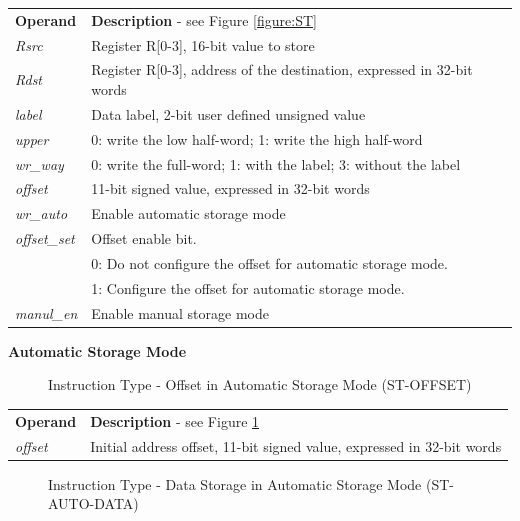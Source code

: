 \documentclass[main\_\_EN.tex]{subfiles}
\begin{document}
\begin{tabular}{ l l }
\textbf{Operand} & \textbf{Description} - see Figure \ref{figure:ST} \\
\textit{Rsrc} & Register R[0-3], 16-bit value to store\\
\textit{Rdst} & Register R[0-3], address of the destination, expressed in 32-bit words\\
\textit{label} & Data label, 2-bit user defined unsigned value\\
\textit{upper} & 0: write the low half-word; 1: write the high half-word\\
\textit{wr\_way} & 0: write the full-word; 1: with the label; 3: without the label\\
\textit{offset} & 11-bit signed value, expressed in 32-bit words\\
\textit{wr\_auto} & Enable automatic storage mode \\
\textit{offset\_set} & Offset enable bit. \\
   & 0: Do not configure the offset for automatic storage mode. \\
   & 1: Configure the offset for automatic storage mode. \\
\textit{manul\_en} & Enable manual storage mode

\end{tabular}

\textcolor{istcolor}{\textbf{ Automatic Storage Mode}}

%
%
%
%
%
\begin{figure}[!ht ]
    \centering
    \caption{Instruction Type - Offset in Automatic Storage Mode (ST-OFFSET)}
    \label{figure:ST-AUTO-OFFSET}
\end{figure}

\begin{tabular}{ l l }
\textbf{Operand} & \textbf{Description} - see Figure \ref{figure:ST-AUTO-OFFSET} \\
\textit{offset} & Initial address offset, 11-bit signed value, expressed in 32-bit words\\
\end{tabular}

%
%
%
%
%
%
%
%
\begin{figure}[!ht ]
    \centering
    \caption{Instruction Type - Data Storage in Automatic Storage Mode (ST-AUTO-DATA)}
    \label{figure:ST-AUTO-DATA}
\end{figure}
\end{document}
